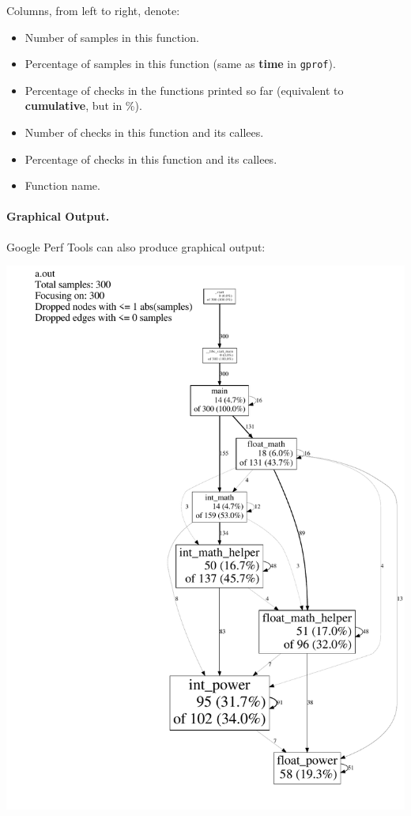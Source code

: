 \documentclass[11pt]{article}
\newenvironment{itemizep}{
 \begin{itemize}
  \setlength{\itemsep}{0pt}
  \setlength{\parsep}{3pt}
  \setlength{\topsep}{3pt}
  \setlength{\partopsep}{0pt}
  \setlength{\leftmargin}{1.5em}
  \setlength{\labelwidth}{1em}
  \setlength{\labelsep}{0.5em} }
 {\end{itemize}}
\begin{document}
Columns, from left to right, denote:
\begin{itemizep}
\item  Number of samples in this function.
\item  Percentage of samples in this function (same as {\bf time} in {\tt gprof}).
\item  Percentage of checks in the functions printed so far (equivalent to {\bf cumulative}, but in \%).
\item     Number of checks in this function and its callees.
\item     Percentage of checks in this function and its callees.
\item    Function name.
\end{itemizep}

\newpage
\paragraph{Graphical Output.} Google Perf Tools can also produce graphical output:

\begin{center}
    \includegraphics[scale=0.3]{L26/test}
\end{center}
\end{document}

